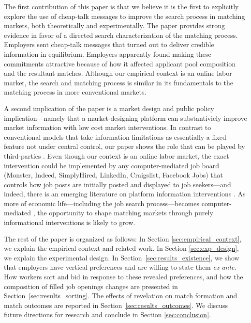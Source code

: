\documentclass[12pt]{article}
\begin{document}
The first contribution of this paper is that we believe it is the first to explicitly explore the use of cheap-talk messages to improve the search process in matching markets, both theoretically and experimentally.
The paper provides strong evidence in favor of a directed search characterization of the matching process.
Employers sent cheap-talk messages that turned out to deliver credible information in equilibrium.
Employers apparently found making these commitments attractive because of how it affected applicant pool composition and the resultant matches.
Although our empirical context is an online labor market, the search and matching process is similar in its fundamentals to the matching process in more conventional markets. 

A second implication of the paper is a market design and public policy implication---namely that a market-designing platform can substantiviely improve market information with low cost market interventions.
In contrast to conventional models that take information limitations as essentially a fixed feature not under central control, our paper shows the role that can be played by third-parties \citep{autor2008economics}.
Even though our context is an online labor market, the exact intervention could be implemented by any computer-mediated job board (Monster, Indeed, SimplyHired, LinkedIn, Craigslist, Facebook Jobs) that controls how job posts are initially posted and displayed to job seekers---and indeed, there is an emerging literature on platform information interventions \citep{bhole2021}.
As more of economic life---including the job search process---becomes computer-mediated \citep{kuhn2004internet,kuhn2014internet,varian2010computer,marinescu2016opening}, the opportunity to shape matching markets through purely informational interventions is likely to grow. 

The rest of the paper is organized as follows:
In Section \ref{sec:empirical_context}, we explain the empirical context and related work.
In Section \ref{sec:exp_design}, we explain the experimental design.
In Section~\ref{sec:results_existence}, we show that employers have vertical preferences and are willing to state them \emph{ex ante}. 
How workers sort and bid in response to these revealed preferences, and how the composition of filled job openings changes are presented in Section~\ref{sec:results_sorting}.
The effects of revelation on match formation and match outcomes are reported in Section~\ref{sec:results_outcomes}.
We discuss future directions for research and conclude in Section \ref{sec:conclusion}.
\end{document}

